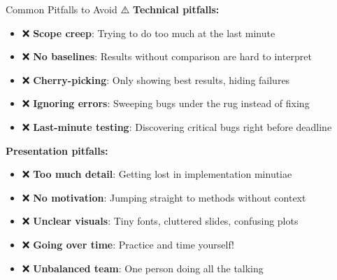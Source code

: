 \documentclass[aspectratio=169]{beamer}
\begin{document}
\begin{frame}[shrink=10]{Common Pitfalls to Avoid ⚠️}
\textbf{Technical pitfalls:}
\begin{itemize}\setlength{\itemsep}{0pt}
    \item ❌ \textbf{Scope creep}: Trying to do too much at the last minute
    \item ❌ \textbf{No baselines}: Results without comparison are hard to interpret
    \item ❌ \textbf{Cherry-picking}: Only showing best results, hiding failures
    \item ❌ \textbf{Ignoring errors}: Sweeping bugs under the rug instead of fixing
    \item ❌ \textbf{Last-minute testing}: Discovering critical bugs right before deadline
\end{itemize}

\vspace{0.3cm}

\textbf{Presentation pitfalls:}
\begin{itemize}\setlength{\itemsep}{0pt}
    \item ❌ \textbf{Too much detail}: Getting lost in implementation minutiae
    \item ❌ \textbf{No motivation}: Jumping straight to methods without context
    \item ❌ \textbf{Unclear visuals}: Tiny fonts, cluttered slides, confusing plots
    \item ❌ \textbf{Going over time}: Practice and time yourself!
    \item ❌ \textbf{Unbalanced team}: One person doing all the talking
\end{itemize}
\end{frame}
\end{document}
